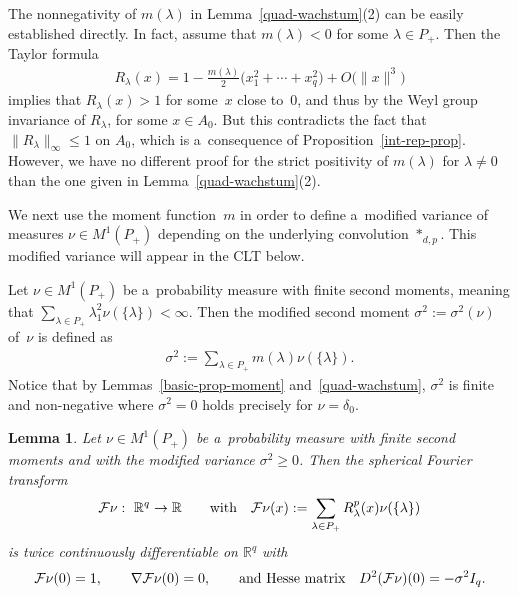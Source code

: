 \documentclass[pdftex]{sigma}
\numberwithin{equation}{section}
\newtheorem{Lemma}[Theorem]{Lemma}
\begin{document}
\begin{Remark}
The nonnegativity of $m(\lambda)$ in Lemma~\ref{quad-wachstum}(2) can be easily established directly.
In fact, assume that $m(\lambda)<0$ for some $\lambda\in P_+$.
Then the Taylor formula
\begin{gather*}
R_\lambda(x)=1-\frac{m(\lambda)}{2}\big(x_1^2+\cdots+x_q^2\big)+O\big(\|x\|^3\big)
\end{gather*}
implies that $R_\lambda(x)>1$ for some~$x$ close to~$0$, and thus by the Weyl group invariance of $R_\lambda$, for some
$x\in A_0$.
But this contradicts the fact that $\|R_\lambda\|_\infty\le1$ on $A_0$, which is a~consequence of
Proposition~\ref{int-rep-prop}.
However, we have no dif\/ferent proof for the strict positivity of $m(\lambda)$ for $\lambda\ne 0$ than the one given in
Lemma~\ref{quad-wachstum}(2).
\end{Remark}

We next use the moment function~$m$ in order to def\/ine a~modif\/ied variance of measures $\nu\in M^1(P_+)$ depending on
the underlying convolution $*_{d,p}$.
This modif\/ied variance will appear in the CLT below.

\begin{Definition}
Let $\nu\in M^1(P_+)$ be a~probability measure with f\/inite second moments, meaning that $\sum\limits_{\lambda\in P_+}
\lambda_1^2 \nu(\{\lambda\})<\infty$. Then the modif\/ied second moment $\sigma^2:=\sigma^2(\nu)$ of~$\nu$ is def\/ined as
\begin{gather*}
\sigma^2:=\sum\limits_{\lambda\in P_+} m(\lambda) \nu(\{\lambda\}).
\end{gather*}
Notice that by Lemmas~\ref{basic-prop-moment} and~\ref{quad-wachstum}, $\sigma^2$ is f\/inite and non-negative where
$\sigma^2=0$ holds precisely for $\nu=\delta_0$.
\end{Definition}

\begin{Lemma}
\label{diffbar}
Let $\nu\in M^1(P_+)$ be a~probability measure with finite second moments and with the modified variance $\sigma^2\ge0$.
Then the spherical Fourier transform
\begin{gather*}
{\cal F}\nu: \ \mathbb R^q\to\mathbb R
\qquad
\text{with}
\quad
{\cal F}\nu(x):=\sum\limits_{\lambda\in P_+} R_\lambda^p(x) \nu(\{\lambda\})
\end{gather*}
is twice continuously differentiable on $\mathbb R^q$ with
\begin{gather*}
{\cal F}\nu(0)=1,
\qquad
\nabla{\cal F}\nu(0)=0,
\qquad
\text{and Hesse matrix}
\quad
D^2({\cal F}\nu)(0)=-\sigma^2  I_q.
\end{gather*}
\end{Lemma}
\end{document}
